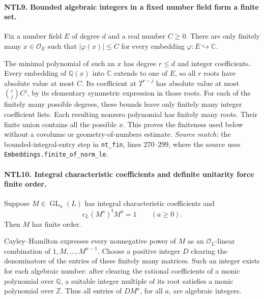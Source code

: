 \paragraph{NTL9. Bounded algebraic integers in a fixed number field form a finite set.}
\label{claim:NTL9}
Fix a number field \(E\) of degree \(d\) and a real number \(C\ge0\).
There are only finitely many \(x\in\mathcal O_E\) such that
\(\lvert\varphi(x)\rvert\le C\) for every embedding
\(\varphi:E\hookrightarrow\mathbb C\).

The minimal polynomial of such an \(x\) has degree \(r\le d\) and
integer coefficients.  Every embedding of \(\mathbb Q(x)\) into
\(\mathbb C\) extends to one of \(E\), so all \(r\) roots have
absolute value at most \(C\).  Its coefficient at \(T^{r-j}\)
has absolute value at most \(\binom rj C^j\), by its elementary
symmetric expression in those roots.  For each of the finitely
many possible degrees, these bounds leave only finitely many integer
coefficient lists.  Each resulting nonzero polynomial has finitely
many roots.  Their finite union contains all the possible \(x\).
This proves the finiteness used below without a covolume or
geometry-of-numbers estimate.
\emph{Source match:} the bounded-integral-entry step in
\texttt{nt\_fin}, lines 270--299, where the source uses
\texttt{Embeddings.finite\_of\_norm\_le}.

\paragraph{NTL10. Integral characteristic coefficients and definite unitarity force finite order.}
\label{claim:NTL10}
Suppose \(M\in\operatorname{GL}_n(L)\) has integral characteristic
coefficients and
\begin{equation}\label{eq:ntl-unitary-powers}
 c_L(M^a)^{\mathsf t}M^a=1\qquad(a\ge0).
\end{equation}
Then \(M\) has finite order.

Cayley--Hamilton expresses every nonnegative power of \(M\) as an
\(\mathcal O_L\)-linear combination of
\(1,M,\ldots,M^{n-1}\).  Choose a positive integer \(D\) clearing
the denominators of the entries of these finitely many matrices.
Such an integer exists for each algebraic number: after clearing
the rational coefficients of a monic polynomial over \(\mathbb Q\),
a suitable integer multiple of its root satisfies a monic polynomial
over \(\mathbb Z\).  Thus all entries of \(DM^a\), for all \(a\),
are algebraic integers.

